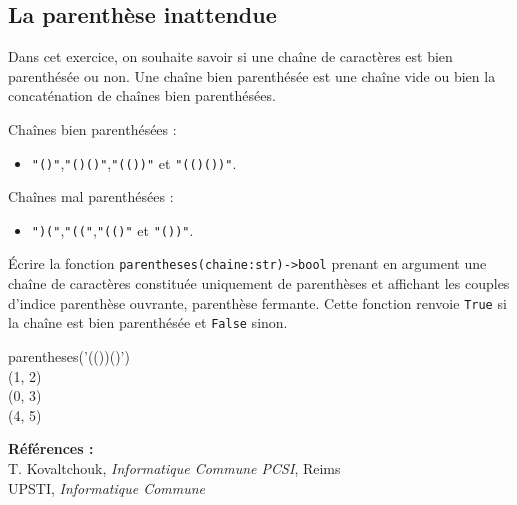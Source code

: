 \begin{python}
\end{python}

\subsection{La parenthèse inattendue}

Dans cet exercice, on souhaite savoir si une chaîne de caractères est bien parenthésée ou non. 
Une chaîne bien parenthésée est une chaîne vide ou bien la concaténation de chaînes bien parenthésées.


\begin{exes}
Chaînes bien parenthésées :
\begin{itemize}
\item \texttt{"()"},\texttt{"()()"},\texttt{"(())"} et \texttt{"(()())"}.
\end{itemize}
Chaînes mal parenthésées :
\begin{itemize}
\item \texttt{")("},\texttt{"(("},\texttt{"(()"} et \texttt{"())"}.
\end{itemize}
\end{exes} 

\begin{qexo}
\'Ecrire la fonction \texttt{parentheses(chaine:str)->bool} prenant en argument une chaîne de caractères constituée uniquement de parenthèses et affichant les couples d'indice parenthèse ouvrante, parenthèse fermante. Cette fonction renvoie \texttt{True} si la chaîne est bien parenthésée et \texttt{False} sinon.
\end{qexo} 

\begin{pythonshell}
\invite parentheses('(())()')\\
(1, 2)\\
(0, 3)\\
(4, 5)
\end{pythonshell}


\vfill
\textbf{Références :}\\
T. Kovaltchouk, \textit{Informatique Commune PCSI}, Reims\\
UPSTI, \textit{Informatique Commune}



\newpage
\renewcommand{\contentsname}{Plan du cours}
\tableofcontents




